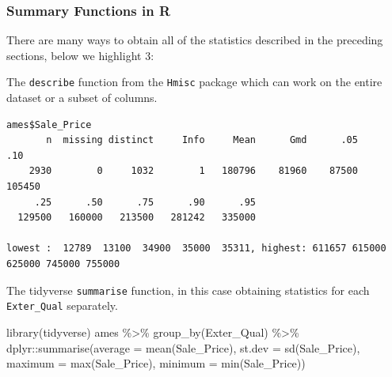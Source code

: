 \documentclass[
  letterpaper,
  DIV=11,
  numbers=noendperiod]{scrreprt}
\newenvironment{Shaded}{\begin{snugshade}}{\end{snugshade}}
\newcommand{\AttributeTok}[1]{\textcolor[rgb]{0.40,0.45,0.13}{#1}}
\newcommand{\FunctionTok}[1]{\textcolor[rgb]{0.28,0.35,0.67}{#1}}
\newcommand{\NormalTok}[1]{\textcolor[rgb]{0.00,0.23,0.31}{#1}}
\newcommand{\SpecialCharTok}[1]{\textcolor[rgb]{0.37,0.37,0.37}{#1}}
\begin{document}
\hypertarget{summary-functions-in-r}{%
\subsubsection*{Summary Functions in R}\label{summary-functions-in-r}}

There are many ways to obtain all of the statistics described in the
preceding sections, below we highlight 3:

The \texttt{describe} function from the \texttt{Hmisc} package which can
work on the entire dataset or a subset of columns.

\begin{Shaded}
\end{Shaded}

\begin{verbatim}
ames$Sale_Price 
       n  missing distinct     Info     Mean      Gmd      .05      .10 
    2930        0     1032        1   180796    81960    87500   105450 
     .25      .50      .75      .90      .95 
  129500   160000   213500   281242   335000 

lowest :  12789  13100  34900  35000  35311, highest: 611657 615000 625000 745000 755000
\end{verbatim}

The tidyverse \texttt{summarise} function, in this case obtaining
statistics for each \texttt{Exter\_Qual} separately.

\begin{Shaded}
\begin{Highlighting}[]
\FunctionTok{library}\NormalTok{(tidyverse)}
\NormalTok{ames }\SpecialCharTok{\%\textgreater{}\%} \FunctionTok{group\_by}\NormalTok{(Exter\_Qual) }\SpecialCharTok{\%\textgreater{}\%}\NormalTok{ dplyr}\SpecialCharTok{::}\FunctionTok{summarise}\NormalTok{(}\AttributeTok{average =} \FunctionTok{mean}\NormalTok{(Sale\_Price), }\AttributeTok{st.dev =} \FunctionTok{sd}\NormalTok{(Sale\_Price), }\AttributeTok{maximum =} \FunctionTok{max}\NormalTok{(Sale\_Price), }\AttributeTok{minimum =} \FunctionTok{min}\NormalTok{(Sale\_Price))}
\end{Highlighting}
\end{Shaded}
\end{document}
